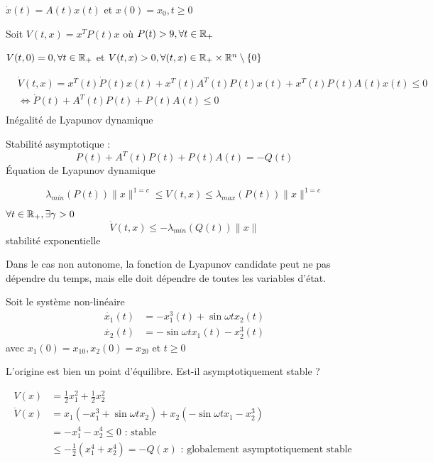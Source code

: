 \documentclass[main.tex]{subfiles} \newcommand{\D}{\mathcal{D}}
\begin{document}
\begin{exemple} $\dot{x}(t) = A(t) x(t)$ et
	$x(0)=x_0, t \geq 0$

  Soit $V(t,x)=x^TP(t)x$ où $P(t) > 9, \forall t \in \mathbb{R}_ +$

  $V(t,0) = 0, \forall t \in \mathbb{R}_+$ et $V(t,x) > 0, \forall (t,x) \in \mathbb{R}_+
	\times \mathbb{R}^n \setminus \{0\}$

  \begin{align*} & \dot{V}(t,x) = x^T(t) \dot{P}(t) x(t) + x^T(t)A^T(t)P(t)x(t)
  + x^T(t)P(t)A(t)x(t) \leq 0 \\ & \Leftrightarrow \dot{P}(t) + A^T(t)P(t) +
  P(t)A(t) \leq 0 \\ \end{align*} Inégalité de Lyapunov dynamique

  Stabilité asymptotique : \[ P(t)+A^T(t)P(t) + P(t)A(t) = - Q(t) \] Équation
	de Lyapunov dynamique

  \[ \lambda_{min}(P(t)) \|x\|^{1=c} \leq V(t,x) \leq \lambda_{max}(P(t))
	\|x\|^{1=c} \]

  $\forall t \in \mathbb{R}_+, \exists \gamma > 0$ \[ \dot{V}(t,x) \leq
-\lambda_{min}(Q(t))\|x\| \] stabilité exponentielle \end{exemple}

\begin{rem} Dans le cas non autonome, la fonction de Lyapunov candidate peut ne
pas dépendre du temps, mais elle doit dépendre de toutes les variables d'état.
\end{rem}

\begin{exemple} Soit le système non-linéaire \begin{align*} \dot{x_1}(t) & =
-x_1^3(t) + \sin \omega t x_2(t) \\ \dot{x_2}(t) & = - \sin \omega t x_1(t)  -
x_2^3(t) \end{align*} avec $x_1(0) = x_{10}, x_2(0) = x_{20}$ et $t\geq 0$

  L'origine est bien un point d'équilibre. Est-il asymptotiquement stable ?

  \begin{align*} V(x) & = \frac{1}{2} x_1^2 + \frac{1}{2}x_2^2 \\ \dot{V}(x) &
	  = x_1 (-x_1^3 + \sin \omega t x_2) + x_2(-\sin \omega t x_1 - x_2^3) \\ &
	  = -x_1^4 - x_2 ^4 \leq 0 \text{ : stable } \\ & \leq - \frac{1}{2}(x_1^4
	  + x_2^4) = -Q(x) \text{ : globalement asymptotiquement stable }
  \end{align*} \end{exemple}
\end{document}
